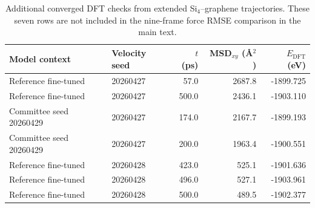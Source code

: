\documentclass[11pt]{article}
\begin{document}
\begin{table}[H]
  \centering
  \scriptsize
  \caption{Additional converged DFT checks from extended Si$_4$--graphene
  trajectories. These seven rows are not included in the nine-frame force RMSE
  comparison in the main text.}
  \label{tab:si_extended_snapshots}
  \begin{tabular}{llrrr}
    \toprule
    Model context & Velocity seed & $t$ (ps) & MSD$_{xy}$ (\AA$^2$) & $E_{\mathrm{DFT}}$ (eV) \\
    \midrule
    Reference fine-tuned & 20260427 & 57.0 & 2687.8 & -1899.725 \\
    Reference fine-tuned & 20260427 & 500.0 & 2436.1 & -1903.110 \\
    Committee seed 20260429 & 20260427 & 174.0 & 2167.7 & -1899.193 \\
    Committee seed 20260429 & 20260427 & 200.0 & 1963.4 & -1900.551 \\
    Reference fine-tuned & 20260428 & 423.0 & 525.1 & -1901.636 \\
    Reference fine-tuned & 20260428 & 496.0 & 527.1 & -1903.961 \\
    Reference fine-tuned & 20260428 & 500.0 & 489.5 & -1902.377 \\
    \bottomrule
  \end{tabular}
\end{table}
\end{document}
